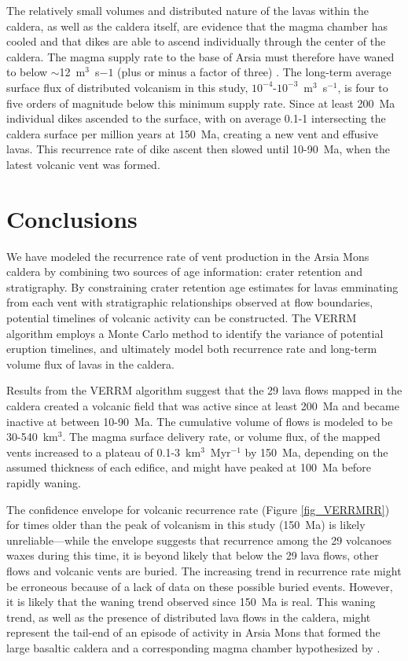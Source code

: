 \documentclass[12pt,letter]{article}
\begin{document}
The relatively small volumes and distributed nature of the lavas within the caldera, as well as the caldera itself, are evidence that the magma chamber has cooled and that dikes are able to ascend individually through the center of the caldera. The magma supply rate to the base of Arsia must therefore have waned to below $\sim$12~m$^3$~s$-1$ (plus or minus a factor of three) \citep{wilson2001evidence}. The long-term average surface flux of distributed volcanism in this study, $10^{-4}$-$10^{-3}$~m$^3$~s$^{-1}$, is four to five orders of magnitude below this minimum supply rate. Since at least 200~Ma individual dikes ascended to the surface, with on average 0.1-1 intersecting the caldera surface per million years at 150~Ma, creating a new vent and effusive lavas. This recurrence rate of dike ascent then slowed until 10-90~Ma, when the latest volcanic vent was formed.

\section{Conclusions}

We have modeled the recurrence rate of vent production in the Arsia Mons caldera by combining two sources of age information: crater retention and stratigraphy. By constraining crater retention age estimates for lavas emminating from each vent with stratigraphic relationships observed at flow boundaries, potential timelines of volcanic activity can be constructed. The VERRM algorithm employs a Monte Carlo method to identify the variance of potential eruption timelines, and ultimately model both recurrence rate and long-term volume flux of lavas in the caldera.

Results from the VERRM algorithm suggest that the 29 lava flows mapped in the caldera created a volcanic field that was active since at least 200~Ma and became inactive at between 10-90~Ma. The cumulative volume of flows is modeled to be 30-540~km$^3$. The magma surface delivery rate, or volume flux, of the mapped vents increased to a plateau of 0.1-3~km$^3$~Myr$^{-1}$ by 150~Ma, depending on the assumed thickness of each edifice, and might have peaked at 100~Ma before rapidly waning.

The confidence envelope for volcanic recurrence rate (Figure \ref{fig_VERRMRR}) for times older than the peak of volcanism in this study (150~Ma) is likely unreliable---while the envelope suggests that recurrence among the 29 volcanoes waxes during this time, it is beyond likely that below the 29 lava flows, other flows and volcanic vents are buried. The increasing trend in recurrence rate might be erroneous because of a lack of data on these possible buried events. However, it is likely that the waning trend observed since 150~Ma is real. This waning trend, as well as the presence of distributed lava flows in the caldera, might represent the tail-end of an episode of activity in Arsia Mons that formed the large basaltic caldera and a corresponding magma chamber hypothesized by \citet{wilson2001evidence}. 
\end{document}
